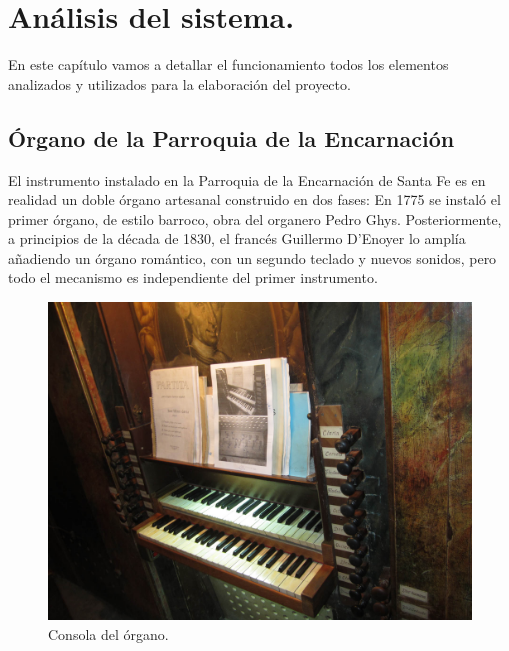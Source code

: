 
\chapter{Análisis del sistema.}
\label{cap:capitulo_3}

En este capítulo vamos a detallar el funcionamiento todos los elementos analizados y utilizados para la elaboración del proyecto.

\section{Órgano de la Parroquia de la Encarnación}

El instrumento instalado en la Parroquia de la Encarnación de Santa Fe es en realidad un doble órgano artesanal construido en dos fases: En 1775 se instaló el primer órgano, de estilo barroco, obra del organero Pedro Ghys. Posteriormente, a principios de la década de 1830, el francés Guillermo D'Enoyer lo amplía añadiendo un órgano romántico, con un segundo teclado y nuevos sonidos, pero todo el mecanismo es independiente del primer instrumento.

\smallskip

\begin{figure}[H]
	\noindent \begin{centering}
		\includegraphics[width=\linewidth*3/4]{capitulo3/consola}
		\par\end{centering}
	\smallskip
	\caption{\label{fig:consola} Consola del órgano.}
\end{figure} 

